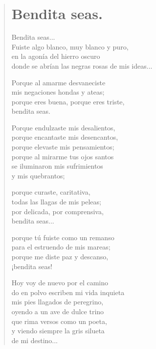 \documentclass[11pt, portrait, twoside, notitlepage, openright]{book}
\begin{document}
\newpage
\begin{verse}
\begin{center}
\section{Bendita seas.}
\end{center}
Bendita seas...\\
Fuiste algo blanco, muy blanco y puro,\\
en la agonía del hierro oscuro\\
donde se abrían las negras rosas de mis ideas...
\newline

Porque al amarme desvaneciste\\
mis negaciones hondas y ateas;\\
porque eres buena, porque eres triste,\\
bendita seas.
\newline

Porque endulzaste mis desalientos,\\
porque encantaste mis desencantos,\\
porque elevaste mis pensamientos;\\
porque al mirarme tus ojos santos\\
se iluminaron mis sufrimientos\\
y mis quebrantos;
\newline

porque curaste, caritativa,\\
todas las llagas de mis peleas;\\
por delicada, por comprensiva,\\
bendita seas...
\newpage

porque tú fuiste como un remanso\\
para el estruendo de mis mareas;\\
porque me diste paz y descanso,\\
¡bendita seas!
\newline

Hoy voy de nuevo por el camino\\
do en polvo escriben mi vida inquieta\\
mis pies llagados de peregrino,\\
oyendo a un ave de dulce trino\\
que rima versos como un poeta,\\
y viendo siempre la gris silueta\\
de mi destino...
\newline


\end{verse}
\end{document}
